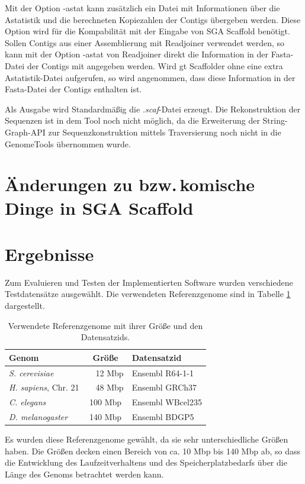 \documentclass[a4paper,10pt,parskip]{scrartcl}
\begin{document}
Mit der Option -astat kann zusätzlich ein Datei mit Informationen über
die Astatistik und die berechneten Kopiezahlen der Contigs übergeben
werden. Diese Option wird für die Kompabilität mit der Eingabe von SGA
Scaffold benötigt. Sollen Contigs aus einer Assemblierung mit
Readjoiner verwendet werden, so kann mit der Option -astat von
Readjoiner direkt die Information in der Fasta-Datei der Contigs mit
angegeben werden. Wird gt Scaffolder ohne eine extra Astatistik-Datei
aufgerufen, so wird angenommen, dass diese Information in der
Fasta-Datei der Contigs enthalten ist.

Als Ausgabe wird Standardmäßig die \textit{.scaf}-Datei
erzeugt. Die Rekonstruktion der Sequenzen ist in dem Tool noch nicht
möglich, da die Erweiterung der String-Graph-API zur
Sequenzkonstruktion mittels Traversierung noch nicht in die
GenomeTools übernommen wurde.

\section{Änderungen zu bzw.\,komische Dinge in SGA Scaffold}

\section{Ergebnisse}

Zum Evaluieren und Testen der Implementierten Software wurden
verschiedene Testdatensätze ausgewählt. Die verwendeten Referenzgenome
sind in Tabelle \ref{tab: Referenzgenome} dargestellt.

\begin{table}
  \centering
  \begin{tabular}{l | c | l}
    Genom & Größe & Datensatzid \\
    \hline
    \textit{S. cerevisiae} & ~~12 Mbp & Ensembl R64-1-1 \\
    \textit{H. sapiens}, Chr. 21 & ~~48 Mbp & Ensembl GRCh37 \\
    \textit{C. elegans} & 100 Mbp & Ensembl WBcel235 \\
    \textit{D. melanogaster} & 140 Mbp & Ensembl BDGP5
  \end{tabular}
  \caption{\label{tab: Referenzgenome} Verwendete Referenzgenome mit
    ihrer Größe und den Datensatzids.}
\end{table}

Es wurden diese Referenzgenome gewählt, da sie sehr unterschiedliche
Größen haben. Die Größen decken einen Bereich von ca. 10 Mbp bis 140
Mbp ab, so dass die Entwicklung des Laufzeitverhaltens und des
Speicherplatzbedarfs über die Länge des Genoms betrachtet werden kann.
\end{document}
